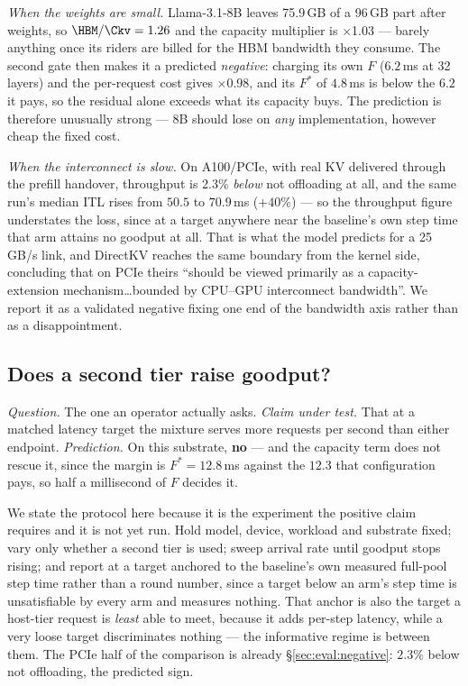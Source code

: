 \emph{When the weights are small.} Llama-3.1-8B leaves 75.9\,GB of a 96\,GB part
after weights, so $\HBM/\Ckv = 1.26$ and the capacity multiplier is $\times$1.03 ---
barely anything once its riders are billed for the HBM bandwidth they consume. The
second gate then makes it a predicted \emph{negative}: charging its own $F$
($6.2$\,ms at 32 layers) and the per-request cost gives $\times$0.98, and its
$F^{*}$ of $4.8$\,ms is below the $6.2$ it pays, so the residual alone exceeds what
its capacity buys. The prediction is therefore unusually strong --- 8B should lose on
\emph{any} implementation, however cheap the fixed cost.

\emph{When the interconnect is slow.} On A100/PCIe, with real KV delivered through
the prefill handover, throughput is 2.3\% \emph{below} not offloading at all, and
the same run's median ITL rises from $50.5$ to $70.9$\,ms ($+40\%$) --- so the
throughput figure understates the loss, since at a target anywhere near the
baseline's own step time that arm attains no goodput at all.
That is what the model predicts for a 25\,GB/s link, and DirectKV reaches the same
boundary from the kernel side, concluding that on PCIe theirs ``should be viewed
primarily as a capacity-extension mechanism\ldots bounded by CPU--GPU interconnect
bandwidth''. We report it as a validated negative fixing one end of the bandwidth
axis rather than as a disappointment.

\subsection{Does a second tier raise goodput?}
\label{sec:eval:goodput}

\emph{Question.} The one an operator actually asks. \emph{Claim under test.} That at
a matched latency target the mixture serves more requests per second than either
endpoint. \emph{Prediction.} On this substrate, \textbf{no} --- and the capacity term
does not rescue it, since the margin is $F^{*} = 12.8$\,ms against the $12.3$ that
configuration pays, so half a millisecond of $F$ decides it.

We state the protocol here because it is the experiment the positive claim requires
and it is not yet run. Hold model, device, workload and substrate fixed; vary only
whether a second tier is used; sweep arrival rate until goodput stops rising; and
report at a target anchored to the baseline's own measured full-pool step time
rather than a round number, since a target below an arm's step time is
unsatisfiable by every arm and measures nothing. That anchor is also the target a
host-tier request is \emph{least} able to meet, because it adds per-step latency,
while a very loose target discriminates nothing --- the informative regime is
between them. The PCIe half of the comparison is already
\S\ref{sec:eval:negative}: $2.3\%$ below not offloading, the predicted sign.

